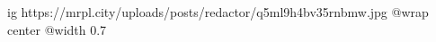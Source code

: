  
 
 
 
 

\ifcmt
  ig https://mrpl.city/uploads/posts/redactor/q5ml9h4bv35rnbmw.jpg
  @wrap center
  @width 0.7
\fi
